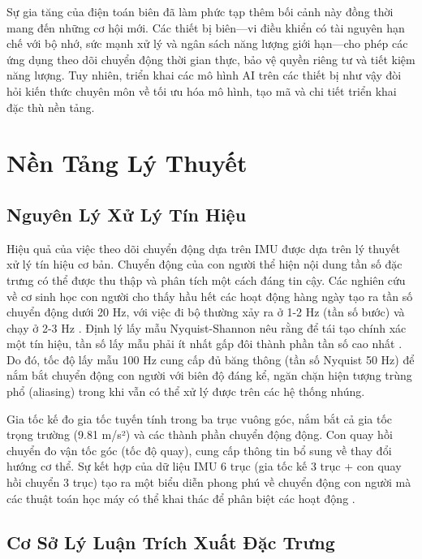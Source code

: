 Sự gia tăng của điện toán biên đã làm phức tạp thêm bối cảnh này đồng thời mang đến những cơ hội mới. Các thiết bị biên—vi điều khiển có tài nguyên hạn chế với bộ nhớ, sức mạnh xử lý và ngân sách năng lượng giới hạn—cho phép các ứng dụng theo dõi chuyển động thời gian thực, bảo vệ quyền riêng tư và tiết kiệm năng lượng. Tuy nhiên, triển khai các mô hình AI trên các thiết bị như vậy đòi hỏi kiến thức chuyên môn về tối ưu hóa mô hình, tạo mã và chi tiết triển khai đặc thù nền tảng.

\section{Nền Tảng Lý Thuyết}

\subsection{Nguyên Lý Xử Lý Tín Hiệu}

Hiệu quả của việc theo dõi chuyển động dựa trên IMU được dựa trên lý thuyết xử lý tín hiệu cơ bản. Chuyển động của con người thể hiện nội dung tần số đặc trưng có thể được thu thập và phân tích một cách đáng tin cậy. Các nghiên cứu về cơ sinh học con người cho thấy hầu hết các hoạt động hàng ngày tạo ra tần số chuyển động dưới 20 Hz, với việc đi bộ thường xảy ra ở 1-2 Hz (tần số bước) và chạy ở 2-3 Hz \cite{whittle2014gait}. Định lý lấy mẫu Nyquist-Shannon nêu rằng để tái tạo chính xác một tín hiệu, tần số lấy mẫu phải ít nhất gấp đôi thành phần tần số cao nhất \cite{oppenheim1999discrete}. Do đó, tốc độ lấy mẫu 100 Hz cung cấp đủ băng thông (tần số Nyquist 50 Hz) để nắm bắt chuyển động con người với biên độ đáng kể, ngăn chặn hiện tượng trùng phổ (aliasing) trong khi vẫn có thể xử lý được trên các hệ thống nhúng.

Gia tốc kế đo gia tốc tuyến tính trong ba trục vuông góc, nắm bắt cả gia tốc trọng trường (9.81 m/s²) và các thành phần chuyển động động. Con quay hồi chuyển đo vận tốc góc (tốc độ quay), cung cấp thông tin bổ sung về thay đổi hướng cơ thể. Sự kết hợp của dữ liệu IMU 6 trục (gia tốc kế 3 trục + con quay hồi chuyển 3 trục) tạo ra một biểu diễn phong phú về chuyển động con người mà các thuật toán học máy có thể khai thác để phân biệt các hoạt động \cite{filippeschi2017survey_imu}.

\subsection{Cơ Sở Lý Luận Trích Xuất Đặc Trưng}

